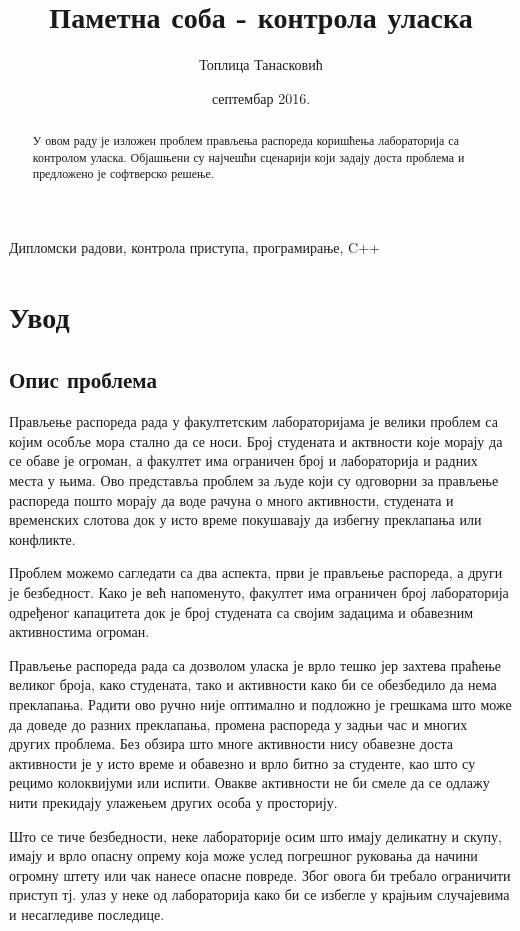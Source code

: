 \documentclass[a4paper, 12pt, diplomski]{etfcyr}
\title{Паметна соба - контрола уласка}
\author{Топлица Танасковић}
\date{септембар 2016.}
\begin{document}
	\sloppy
	\maketitle
	\begin{abstract}
		\begin{justify}
			У овом раду је изложен проблем прављења распореда коришћења лабораторија са контролом уласка. Објашњени су најчешћи сценарији који задају доста проблема и предложено је софтверско решење.
		\end{justify}
	\end{abstract}

	\begin{keywords}
		Дипломски радови, контрола приступа, програмирање, C++
	\end{keywords}
	\tableofcontents
	\listoffigures
	\listoftables

	\chapter{Увод}
		
		\section{Опис проблема}
		
		\begin{justify}
			Прављење распореда рада у факултетским лабораторијама је велики проблем са којим особље мора стално да се носи. Број студената и актвности које морају да се обаве је огроман, а факултет има ограничен број и лабораторија и радних места у њима. Ово представља проблем за људе који су одговорни за прављење распореда пошто морају да воде рачуна о много активности, студената и временских слотова док у исто време покушавају да избегну преклапања или конфликте.
		
			Проблем можемо сагледати са два аспекта, први је прављење распореда, а други је безбедност. Како је већ напоменуто, факултет има ограничен број лабораторија одређеног капацитета док је број студената са својим задацима и обавезним активностима огроман.
		
			Прављење распореда рада са дозволом уласка је врло тешко јер захтева праћење великог броја, како студената, тако и активности како би се обезбедило да нема преклапања. Радити ово ручно није оптимално и подложно је грешкама што може да доведе до разних преклапања, промена распореда у задњи час и многих других проблема. Без обзира што многе активности нису обавезне доста активности је у исто време и обавезно и врло битно за студенте, као што су рецимо колоквијуми или испити. Овакве активности не би смеле да се одлажу нити прекидају улажењем других особа у просторију.
		
			Што се тиче безбедности, неке лабораторије осим што имају деликатну и скупу, имају и врло опасну опрему која може услед погрешног руковања да начини огромну штету или чак нанесе опасне повреде. Због овога би требало ограничити приступ тј. улаз у неке од лабораторија како би се избегле у крајњим случајевима и несагледиве последице.
		\end{justify}
\end{document}
